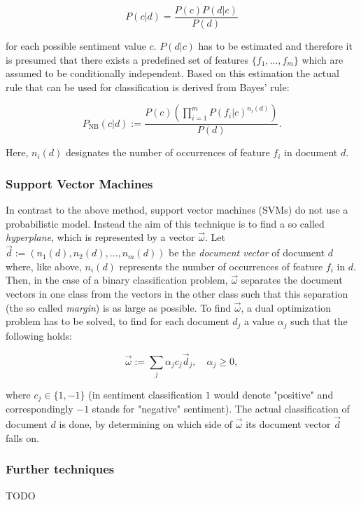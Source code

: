 \begin{equation*}
P(c \vert d) = \frac{P(c)P(d \vert c)}{P(d)}
\end{equation*}

for each possible sentiment value $c$. $P(d \vert c)$ has to be estimated and therefore it is presumed that there exists a predefined set of features $\lbrace f_1, \ldots , f_m \rbrace$ which are assumed to be conditionally independent. Based on this estimation the actual rule that can be used for classification is derived from Bayes' rule:

\begin{equation*}
P_{\mathrm{NB}}(c \vert d) := \frac{P(c)(\prod^{m}_{i=1}P(f_i \vert c)^{n_i(d)})}{P(d)}.
\end{equation*}

Here, $n_i(d)$ designates the number of occurrences of feature $f_i$ in document $d$.

\subsubsection*{Support Vector Machines}

In contrast to the above method, support vector machines (SVMs) do not use a probabilistic model. Instead the aim of this technique is to find a so called \emph{hyperplane}, which is represented by a vector $\vec{\omega}$. Let $\vec{d} := (n_1(d), n_2(d),\ldots , n_m(d))$ be the \emph{document vector} of document $d$ where, like above, $n_i(d)$ represents the number of occurrences of feature $f_i$ in $d$. Then, in the case of a binary classification problem, $\vec{\omega}$ separates the document vectors in one class from the vectors in the other class such that this separation (the so called \emph{margin}) is as large as possible. To find $\vec{\omega}$, a dual optimization problem has to be solved, to find for each document $d_j$ a value $\alpha_j$ such that the following holds:

\begin{equation*}
\vec{\omega} := \sum_j \alpha_j c_j \vec{d}_j,\quad \alpha_j \geq 0,
\end{equation*}

where $c_j \in \lbrace 1, -1\rbrace$ (in sentiment classification $1$ would denote "positive" and correspondingly $-1$ stands for "negative" sentiment). The actual classification of document $d$ is done, by determining on which side of $\vec{\omega}$ its document vector $\vec{d}$ falls on.

\subsubsection*{Further techniques}

TODO